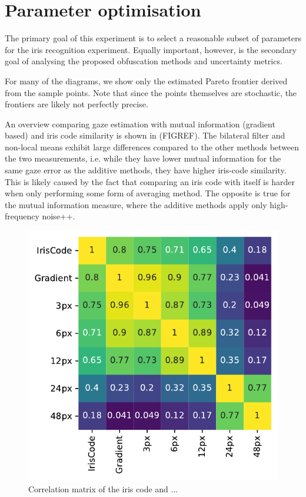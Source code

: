\section{Parameter optimisation}
The primary goal of this experiment is to select a reasonable subset of parameters for the iris recognition experiment. Equally important, however, is the secondary goal of analysing the proposed obfuscation methods and uncertainty metrics. 

For many of the diagrams, we show only the estimated Pareto frontier derived from the sample points. Note that since the points themselves are stochastic, the frontiers are likely not perfectly precise.

An overview comparing gaze estimation with mutual information (gradient based) and iris code similarity is shown in (FIGREF). The bilateral filter and non-local means exhibit large differences compared to the other methods between the two measurements, i.e. while they have lower mutual information for the same gaze error as the additive methods, they have higher iris-code similarity. This is likely caused by the fact that comparing an iris code with itself is harder when only performing some form of averaging method. The opposite is true for the mutual information measure, where the additive methods apply only high-frequency noise++. 

\begin{figure}
    \centering
    \includegraphics[width=0.8\linewidth]{figures/h1.pdf}
    \caption{Correlation matrix of the iris code and ...}
    \label{fig:h1}
\end{figure}

